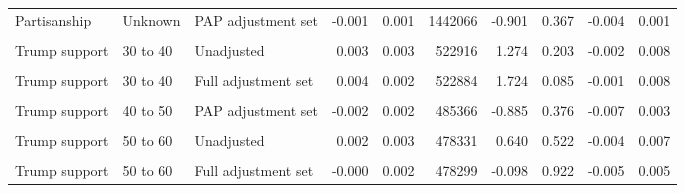 \begin{table}
\begin{tabular}[t]{lllrrrrrrr}
Partisanship & Unknown & PAP adjustment set & -0.001 & 0.001 & 1442066 & -0.901 & 0.367 & -0.004 & 0.001\\
\cellcolor{gray!10}{Partisanship} & \cellcolor{gray!10}{Unknown} & \cellcolor{gray!10}{Full adjustment set} & \cellcolor{gray!10}{-0.001} & \cellcolor{gray!10}{0.001} & \cellcolor{gray!10}{1442040} & \cellcolor{gray!10}{-0.783} & \cellcolor{gray!10}{0.434} & \cellcolor{gray!10}{-0.004} & \cellcolor{gray!10}{0.002}\\
Trump support & 30 to 40 & Unadjusted & 0.003 & 0.003 & 522916 & 1.274 & 0.203 & -0.002 & 0.008\\
\cellcolor{gray!10}{Trump support} & \cellcolor{gray!10}{30 to 40} & \cellcolor{gray!10}{PAP adjustment set} & \cellcolor{gray!10}{0.004} & \cellcolor{gray!10}{0.002} & \cellcolor{gray!10}{522913} & \cellcolor{gray!10}{1.613} & \cellcolor{gray!10}{0.107} & \cellcolor{gray!10}{-0.001} & \cellcolor{gray!10}{0.008}\\
Trump support & 30 to 40 & Full adjustment set & 0.004 & 0.002 & 522884 & 1.724 & 0.085 & -0.001 & 0.008\\
\cellcolor{gray!10}{Trump support} & \cellcolor{gray!10}{40 to 50} & \cellcolor{gray!10}{Unadjusted} & \cellcolor{gray!10}{-0.002} & \cellcolor{gray!10}{0.003} & \cellcolor{gray!10}{485369} & \cellcolor{gray!10}{-0.601} & \cellcolor{gray!10}{0.548} & \cellcolor{gray!10}{-0.007} & \cellcolor{gray!10}{0.004}\\
Trump support & 40 to 50 & PAP adjustment set & -0.002 & 0.002 & 485366 & -0.885 & 0.376 & -0.007 & 0.003\\
\cellcolor{gray!10}{Trump support} & \cellcolor{gray!10}{40 to 50} & \cellcolor{gray!10}{Full adjustment set} & \cellcolor{gray!10}{-0.002} & \cellcolor{gray!10}{0.002} & \cellcolor{gray!10}{485337} & \cellcolor{gray!10}{-0.818} & \cellcolor{gray!10}{0.413} & \cellcolor{gray!10}{-0.007} & \cellcolor{gray!10}{0.003}\\
Trump support & 50 to 60 & Unadjusted & 0.002 & 0.003 & 478331 & 0.640 & 0.522 & -0.004 & 0.007\\
\cellcolor{gray!10}{Trump support} & \cellcolor{gray!10}{50 to 60} & \cellcolor{gray!10}{PAP adjustment set} & \cellcolor{gray!10}{-0.001} & \cellcolor{gray!10}{0.003} & \cellcolor{gray!10}{478328} & \cellcolor{gray!10}{-0.296} & \cellcolor{gray!10}{0.767} & \cellcolor{gray!10}{-0.006} & \cellcolor{gray!10}{0.004}\\
Trump support & 50 to 60 & Full adjustment set & -0.000 & 0.002 & 478299 & -0.098 & 0.922 & -0.005 & 0.005\\

\end{tabular}
\end{table}
